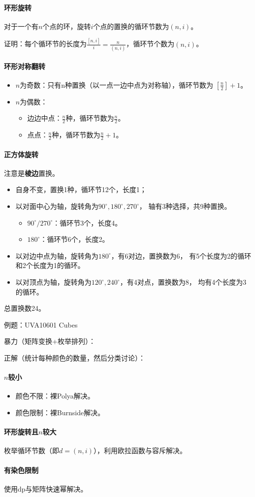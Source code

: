 \paragraph{环形旋转}
对于一个有$n$个点的环，旋转$i$个点的置换的循环节数为$(n,i)$。

证明：每个循环节的长度为$\frac{[n,i]}{i}=\frac{n}{(n,i)}$，循环节个数为$(n,i)$。
\paragraph{环形对称翻转}
\begin{itemize}
	\item $n$为奇数：只有n种置换（以一点一边中点为对称轴），循环节数为
	      $[\frac{n}{2}]+1$。
	\item $n$为偶数：\begin{itemize}
		      \item 边边中点：$\frac{n}{2}$种，循环节数为$\frac{n}{2}$。
		      \item 点点：$\frac{n}{2}$种，循环节数为$\frac{n}{2}+1$。
	      \end{itemize}
\end{itemize}
\paragraph{正方体旋转}
注意是{\bfseries 棱边}置换。
\begin{itemize}
	\item 自身不变，置换1种，循环节12个，长度1；
	\item 以对面中心为轴，旋转角为$90^\circ,180^\circ,270^\circ$，
	      轴有3种选择，共9种置换。
	      \begin{itemize}
		      \item $90^\circ/270^\circ$：循环节3个，长度4。
		      \item $180^\circ$：循环节6个，长度2。
	      \end{itemize}
	\item 以对边中点为轴，旋转角为$180^\circ$，有6对边，置换数为6，
	      有5个长度为2的循环和2个长度为1的循环。
	\item 以对顶点为轴，旋转角为$120^\circ,240^\circ$，有4对点，置换数为8，
	      均有4个长度为3的循环。
\end{itemize}
总置换数24。

例题：UVA10601 Cubes

暴力（矩阵变换+枚举排列）：


正解（统计每种颜色的数量，然后分类讨论）：


\paragraph{$n$较小}
\begin{itemize}
	\item 颜色不限：裸Polya解决。
	\item 颜色限制：裸Burnside解决。
\end{itemize}
\paragraph{环形旋转且$n$较大}
枚举循环节数（即$d=(n,i)$），利用欧拉函数与容斥解决。
\paragraph{有染色限制}
使用dp与矩阵快速幂解决。

